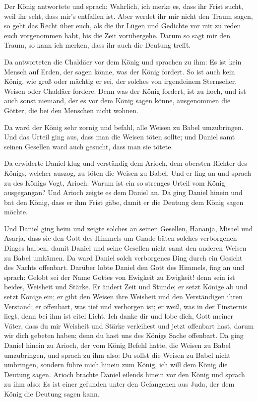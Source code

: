 Der König antwortete und sprach: Wahrlich, ich merke es,
dass ihr Frist sucht, weil ihr seht, dass mir's entfallen ist.
 Aber werdet ihr mir nicht den Traum sagen, so geht das
Recht über euch, als die ihr Lügen und Gedichte vor mir zu reden euch
vorgenommen habt, bis die Zeit vorübergehe. Darum so sagt mir den Traum,
so kann ich merken, dass ihr auch die Deutung trefft.

 Da antworteten die Chaldäer vor dem König und sprachen
zu ihm: Es ist kein Mensch auf Erden, der sagen könne, was der König
fordert. So ist auch kein König, wie groß oder mächtig er sei, der
solches von irgendeinem Sternseher, Weisen oder Chaldäer fordere.
 Denn was der König fordert, ist zu hoch, und ist auch
sonst niemand, der es vor dem König sagen könne, ausgenommen die Götter,
die bei den Menschen nicht wohnen.

 Da ward der König sehr zornig und befahl, alle Weisen zu
Babel umzubringen.  Und das Urteil ging aus, dass man die
Weisen töten sollte; und Daniel samt seinen Gesellen ward auch gesucht,
dass man sie tötete.

 Da erwiderte Daniel klug und verständig dem Arioch, dem
obersten Richter des Königs, welcher auszog, zu töten die Weisen zu
Babel.  Und er fing an und sprach zu des Königs Vogt,
Arioch: Warum ist ein so strenges Urteil vom König ausgegangan? Und
Arioch zeigte es dem Daniel an.  Da ging Daniel hinein
und bat den König, dass er ihm Frist gäbe, damit er die Deutung dem
König sagen möchte.

 Und Daniel ging heim und zeigte solches an seinen
Gesellen, Hananja, Misael und Asarja,  dass sie den Gott
des Himmels um Gnade bäten solches verborgenen Dinges halben, damit
Daniel und seine Gesellen nicht samt den anderen Weisen zu Babel
umkämen.  Da ward Daniel solch verborgenes Ding durch ein
Gesicht des Nachts offenbart.  Darüber lobte Daniel den
Gott des Himmels, fing an und sprach: Gelobt sei der Name Gottes von
Ewigkeit zu Ewigkeit! denn sein ist beides, Weisheit und Stärke.
 Er ändert Zeit und Stunde; er setzt Könige ab und setzt
Könige ein; er gibt den Weisen ihre Weisheit und den Verständigen ihren
Verstand;  er offenbart, was tief und verborgen ist; er
weiß, was in der Finsternis liegt, denn bei ihm ist eitel Licht.
 Ich danke dir und lobe dich, Gott meiner Väter, dass du
mir Weisheit und Stärke verleihest und jetzt offenbart hast, darum wir
dich gebeten haben; denn du hast uns des Königs Sache offenbart.
 Da ging Daniel hinein zu Arioch, der vom König Befehl
hatte, die Weisen zu Babel umzubringen, und sprach zu ihm also: Du
sollst die Weisen zu Babel nicht umbringen, sondern führe mich hinein
zum König, ich will dem König die Deutung sagen.  Arioch
brachte Daniel eilends hinein vor den König und sprach zu ihm also: Es
ist einer gefunden unter den Gefangenen aus Juda, der dem König die
Deutung sagen kann.

